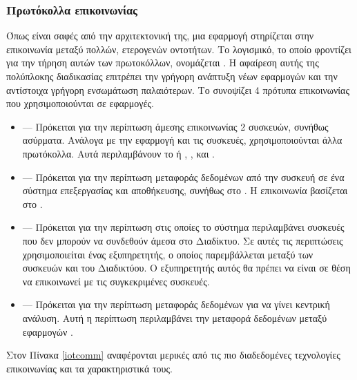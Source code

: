 \subsubsection{Πρωτόκολλα επικοινωνίας}
Όπως είναι σαφές από την αρχιτεκτονική της, μια εφαρμογή  στηρίζεται στην επικοινωνία μεταξύ πολλών, ετερογενών οντοτήτων.
Το λογισμικό, το οποίο φροντίζει για την τήρηση αυτών των πρωτοκόλλων, ονομάζεται .
Η αφαίρεση αυτής της πολύπλοκης διαδικασίας επιτρέπει την γρήγορη ανάπτυξη νέων εφαρμογών και την αντίστοιχα γρήγορη ενσωμάτωση παλαιότερων.
Το  \cite{rfc7452} συνοψίζει 4 πρότυπα επικοινωνίας που χρησιμοποιούνται σε  εφαρμογές.
\begin{itemize}
    \item \textbf{} --- Πρόκειται για την περίπτωση άμεσης επικοινωνίας 2 συσκευών, συνήθως ασύρματα.
    Ανάλογα με την εφαρμογή και τις συσκευές, χρησιμοποιούνται άλλα πρωτόκολλα.
    Αυτά περιλαμβάνουν το  ή , ,  και .
    \item \textbf{} --- Πρόκειται για την περίπτωση μεταφοράς δεδομένων από την συσκευή σε ένα σύστημα επεξεργασίας και αποθήκευσης, συνήθως στο . Η επικοινωνία βασίζεται στο .
    \item \textbf{} --- Πρόκειται για την περίπτωση στις οποίες το σύστημα περιλαμβάνει συσκευές που δεν μπορούν να συνδεθούν άμεσα στο Διαδίκτυο. Σε αυτές τις περιπτώσεις χρησιμοποιείται ένας εξυπηρετητής, ο οποίος παρεμβάλλεται μεταξύ των συσκευών και του Διαδικτύου. Ο εξυπηρετητής αυτός θα πρέπει να είναι σε θέση να επικοινωνεί με τις συγκεκριμένες συσκευές.
    \item \textbf{} --- Πρόκειται για την περίπτωση μεταφοράς δεδομένων για να γίνει κεντρική ανάλυση. Αυτή η περίπτωση περιλαμβάνει την μεταφορά δεδομένων μεταξύ εφαρμογών .
\end{itemize}
\par
Στον Πίνακα \ref{iotcomm} αναφέρονται μερικές από τις πιο διαδεδομένες τεχνολογίες επικοινωνίας και τα χαρακτηριστικά τους.
